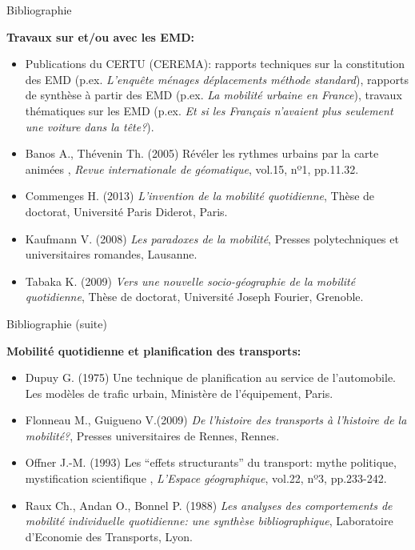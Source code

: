 \documentclass{beamer}
\begin{document}
\begin{frame}{Bibliographie}

\textbf{Travaux sur et/ou avec les EMD:}

\footnotesize
\begin{itemize}
  \item Publications du CERTU (CEREMA): rapports techniques sur la constitution des EMD (p.ex. \textit{L'enquête ménages déplacements méthode standard}), rapports de synthèse à partir des EMD (p.ex. \textit{La mobilité urbaine en France}), travaux thématiques sur les EMD (p.ex. \textit{Et si les Français n'avaient plus seulement une voiture dans la tête?}).
  \item Banos A., Thévenin Th. (2005) \og Révéler les rythmes urbains par la carte animées \fg{}, \emph{Revue internationale de géomatique}, vol.15, nº1, pp.11.32.
  \item Commenges H. (2013) \textit{L'invention de la mobilité quotidienne}, Thèse de doctorat, Université Paris Diderot, Paris.
  \item Kaufmann V. (2008) \textit{Les paradoxes de la mobilité}, Presses polytechniques et universitaires romandes, Lausanne.
  \item Tabaka K. (2009) \textit{Vers une nouvelle socio-géographie de la mobilité quotidienne}, Thèse de doctorat, Université Joseph Fourier, Grenoble.
\end{itemize}

\normalsize
\end{frame}


\begin{frame}{Bibliographie (suite)}

\textbf{Mobilité quotidienne et planification des transports:}

\footnotesize
\begin{itemize}
  \item Dupuy G. (1975) Une technique de planification au service de l'automobile. Les modèles de trafic urbain, Ministère de l'équipement, Paris.
  \item Flonneau M., Guigueno V.(2009) \textit{De l'histoire des transports à l'histoire de la mobilité?}, Presses universitaires de Rennes, Rennes.
  \item Offner J.-M. (1993) \og Les ``effets structurants'' du transport: mythe politique, mystification scientifique \fg{}, \textit{L'Espace géographique}, vol.22, nº3, pp.233-242.
  \item Raux Ch., Andan O., Bonnel P. (1988) \textit{Les analyses des comportements de mobilité individuelle quotidienne: une synthèse bibliographique}, Laboratoire d'Economie des Transports, Lyon.
\end{itemize}

\normalsize
\end{frame}
\end{document}
